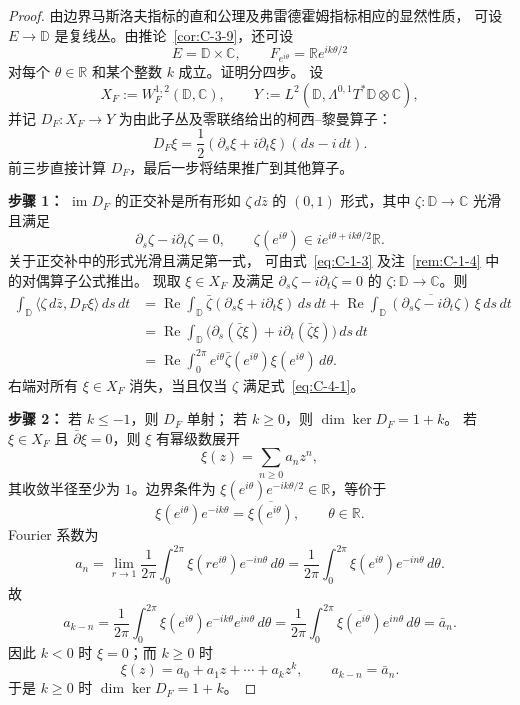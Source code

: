 \begin{proof}
由边界马斯洛夫指标的直和公理及弗雷德霍姆指标相应的显然性质，
可设 $E\to\mathbb D$ 是复线丛。由推论~\ref{cor:C-3-9}，还可设
\[
  E=\mathbb D\times\mathbb C,\qquad
  F_{e^{i\theta}}=\mathbb R e^{ik\theta/2}
\]
对每个 $\theta\in\mathbb R$ 和某个整数 $k$ 成立。证明分四步。
设
\[
  X_F:=W_F^{1,2}(\mathbb D,\mathbb C),\qquad
  Y:=L^2(\mathbb D,\Lambda^{0,1}T^*\mathbb D\otimes\mathbb C),
\]
并记 $D_F:X_F\to Y$ 为由此子丛及零联络给出的柯西--黎曼算子：
\[
  D_F\xi=\frac12(\partial_s\xi+i\partial_t\xi)(ds-i\,dt).
\]
前三步直接计算 $D_F$，最后一步将结果推广到其他算子。

\noindent\textbf{步骤 1：} $\operatorname{im}D_F$ 的正交补是所有形如
$\zeta\,d\bar z$ 的 $(0,1)$ 形式，其中
$\zeta:\mathbb D\to\mathbb C$ 光滑且满足
\begin{equation}\label{eq:C-4-1}
  \partial_s\zeta-i\partial_t\zeta=0,\qquad
  \zeta(e^{i\theta})\in i e^{i\theta+ik\theta/2}\mathbb R.
\end{equation}
关于正交补中的形式光滑且满足第一式，
可由式~\eqref{eq:C-1-3} 及注~\ref{rem:C-1-4} 中的对偶算子公式推出。
现取 $\xi\in X_F$ 及满足 $\partial_s\zeta-i\partial_t\zeta=0$
的 $\zeta:\mathbb D\to\mathbb C$。则
\begin{align*}
  \int_{\mathbb D}\langle\zeta\,d\bar z,D_F\xi\rangle\,ds\,dt
  &=\operatorname{Re}\int_{\mathbb D}
      \bar\zeta(\partial_s\xi+i\partial_t\xi)\,ds\,dt
    +\operatorname{Re}\int_{\mathbb D}
      \overline{(\partial_s\zeta-i\partial_t\zeta)}\,\xi\,ds\,dt\\
  &=\operatorname{Re}\int_{\mathbb D}
      \bigl(\partial_s(\bar\zeta\xi)+i\partial_t(\bar\zeta\xi)\bigr)\,ds\,dt\\
  &=\operatorname{Re}\int_0^{2\pi}
      e^{i\theta}\bar\zeta(e^{i\theta})\xi(e^{i\theta})\,d\theta.
\end{align*}
右端对所有 $\xi\in X_F$ 消失，当且仅当 $\zeta$ 满足式~\eqref{eq:C-4-1}。

\noindent\textbf{步骤 2：} 若 $k\le-1$，则 $D_F$ 单射；
若 $k\ge0$，则 $\dim\ker D_F=1+k$。
若 $\xi\in X_F$ 且 $\bar\partial\xi=0$，则 $\xi$ 有幂级数展开
\[
  \xi(z)=\sum_{n\ge0}a_nz^n,
\]
其收敛半径至少为 $1$。边界条件为
$\xi(e^{i\theta})e^{-ik\theta/2}\in\mathbb R$，等价于
\[
  \xi(e^{i\theta})e^{-ik\theta}
  =\overline{\xi(e^{i\theta})},\qquad\theta\in\mathbb R.
\]
Fourier 系数为
\[
  a_n=\lim_{r\to1}\frac1{2\pi}\int_0^{2\pi}
    \xi(re^{i\theta})e^{-in\theta}\,d\theta
  =\frac1{2\pi}\int_0^{2\pi}
    \xi(e^{i\theta})e^{-in\theta}\,d\theta.
\]
故
\[
  a_{k-n}=\frac1{2\pi}\int_0^{2\pi}
    \xi(e^{i\theta})e^{-ik\theta}e^{in\theta}\,d\theta
  =\frac1{2\pi}\int_0^{2\pi}
    \overline{\xi(e^{i\theta})}e^{in\theta}\,d\theta
  =\bar a_n.
\]
因此 $k<0$ 时 $\xi=0$；而 $k\ge0$ 时
\[
  \xi(z)=a_0+a_1z+\cdots+a_kz^k,\qquad a_{k-n}=\bar a_n.
\]
于是 $k\ge0$ 时 $\dim\ker D_F=1+k$。


\end{proof}
